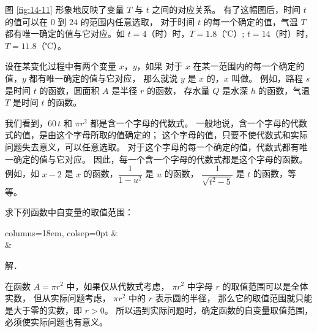 图 \ref{fig:14-11} 形象地反映了变量 $T$ 与 $t$ 之间的对应关系。
有了这幅图后，时间 $t$ 的值可以在 $0$ 到 $24$ 的范围内任意选取，
对于时间 $t$ 的每一个确定的值，气温 $T$ 都有唯一确定的值与它对应。如
$t =  4$（时）时，$T = 1.8$（℃）;
$t = 14$（时）时，$T = 11.8$（℃）。

设在某变化过程中有两个变量 $x$，$y$，如果
对于 $x$ 在某一范围内的每一个确定的值，$y$ 都有唯一确定的值与它对应，
那么就说 $y$ 是 $x$ 的，$x$ 叫做。
例如，路程 $s$ 是时间 $t$ 的函数，圆面积 $A$ 是半径 $r$ 的函数，
存水量 $Q$ 是水深 $h$ 的函数，气温 $T$ 是时间 $t$ 的函数。

\begin{enhancedline}
我们看到，$60\,t$ 和 $\pi r^2$ 都是含一个字母的代数式。
一般地说，含一个字母的代数式的值，是由这个字母所取的值确定的；
这个字母的值，只要不使代数式和实际问题失去意义，可以任意选取。
对于这个字母的每一个确定的值，代数式都有唯一确定的值与它对应。
因此，每一个含一个字母的代数式都是这个字母的函数。
例如，如 $x - 2$ 是 $x$ 的函数，$\dfrac{1}{1 - u^2}$ 是 $u$ 的函数，
$\dfrac{1}{\sqrt{t^2 - 5}}$ 是 $t$ 的函数，等等。


\liti 求下列函数中自变量的取值范围：
\begin{xiaoxiaotis}

    \begin{tblr}{columns={18em, colsep=0pt}}
                    &  \\
          & 
    \end{tblr}

\resetxxt
解． 




\end{xiaoxiaotis}
\end{enhancedline}

\zhuyi 在函数 $A = \pi r^2$ 中，如果仅从代数式考虑，
$\pi r^2$ 中字母 $r$ 的取值范围可以是全体实数，
但从实际问题考虑， $\pi r^2$ 中的 $r$ 表示圆的半径，
那么它的取值范围就只能是大于零的实数，即 $r > 0$。
所以遇到实际问题时，确定函数的自变量取值范围，必须使实际问题也有意义。



